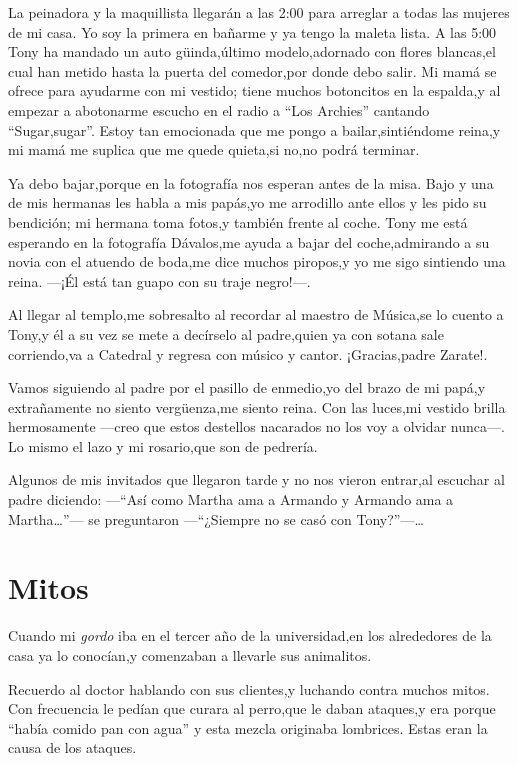 \documentclass[letterpaper,12pt]{book}
\begin{document}
La peinadora y la maquillista llegarán a las 2:00 para arreglar a todas las mujeres de mi casa. Yo soy la primera en bañarme y ya tengo la maleta lista.  A las 5:00 Tony ha mandado un auto güinda,último modelo,adornado con flores blancas,el cual han metido hasta la puerta del comedor,por donde debo salir.  Mi mamá se ofrece para ayudarme con mi vestido; tiene muchos botoncitos en la espalda,y al empezar a abotonarme escucho en el radio a ``Los Archies'' cantando ``Sugar,sugar''. Estoy tan emocionada que me pongo a bailar,sintiéndome reina,y mi mamá me suplica que me quede quieta,si no,no podrá terminar.

Ya debo bajar,porque en la fotografía nos esperan antes de la misa. Bajo y una de mis hermanas les habla a mis papás,yo me arrodillo ante ellos y les pido su bendición; mi hermana toma fotos,y también frente al coche. Tony me está esperando en la fotografía Dávalos,me ayuda a bajar del coche,admirando a su novia con el atuendo de boda,me dice muchos piropos,y yo me sigo sintiendo una reina. ---¡Él está tan guapo con su traje negro!---.

Al llegar al templo,me sobresalto al recordar al maestro de Música,se lo cuento a Tony,y él a su vez se mete a decírselo al padre,quien ya con sotana sale corriendo,va a Catedral y regresa con músico y cantor. ¡Gracias,padre Zarate!.

Vamos siguiendo al padre por el pasillo de enmedio,yo del brazo de mi papá,y extrañamente no siento vergüenza,me siento reina. Con las luces,mi vestido brilla hermosamente ---creo que estos destellos nacarados no los voy a olvidar nunca---. Lo mismo el lazo y mi rosario,que son de pedrería.

Algunos de mis invitados que llegaron tarde y no nos vieron entrar,al escuchar al padre diciendo: ---``Así como Martha ama a Armando y Armando ama a Martha\ldots''--- se preguntaron ---``¿Siempre no se casó con Tony?''---\ldots

\chapter{Mitos}
Cuando mi {\it gordo}\/ iba en el tercer año de la universidad,en los alrededores de la casa ya lo conocían,y comenzaban a llevarle sus animalitos.

Recuerdo al doctor hablando con sus clientes,y luchando contra muchos mitos. Con frecuencia le pedían que curara al perro,que le daban ataques,y era porque ``había comido pan con agua'' y esta mezcla originaba lombrices. Estas eran la causa de los ataques.
\end{document}

